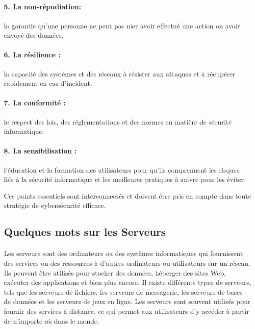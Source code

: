 \documentclass{report}
\begin{document}
\paragraph{5. La non-répudiation: } \paragraph{}la garantie qu'une personne ne peut pas nier avoir effectué une action ou avoir envoyé des données.

\paragraph{6. La résilience :} \paragraph{}la capacité des systèmes et des réseaux à résister aux attaques et à récupérer rapidement en cas d'incident.
\pagebreak

\paragraph{7. La conformité :} \paragraph{}le respect des lois, des réglementations et des normes en matière de sécurité informatique.

\paragraph{8. La sensibilisation :}\paragraph{} l'éducation et la formation des utilisateurs pour qu'ils comprennent les risques liés à la sécurité informatique et les meilleures pratiques à suivre pour les éviter.

Ces points essentiels sont interconnectés et doivent être pris en compte dans toute stratégie de cybersécurité efficace.
  \subsection {Quelques mots sur  les Serveurs }
  \paragraph{ }
  Les serveurs sont des ordinateurs ou des systèmes informatiques qui fournissent des services ou des ressources à d'autres ordinateurs ou utilisateurs sur un réseau. Ils peuvent être utilisés pour stocker des données, héberger des sites Web, exécuter des applications et bien plus encore. Il existe différents types de serveurs, tels que les serveurs de fichiers, les serveurs de messagerie, les serveurs de bases de données et les serveurs de jeux en ligne. Les serveurs sont souvent utilisés pour fournir des services à distance, ce qui permet aux utilisateurs d'y accéder à partir de n'importe où dans le monde.
\end{document}
